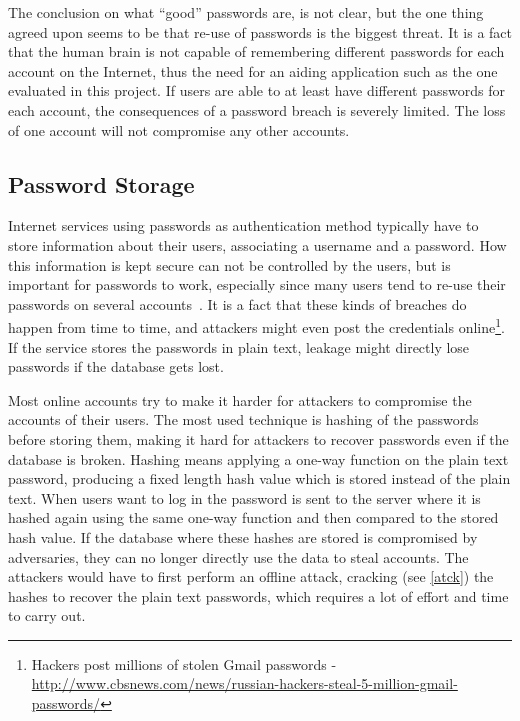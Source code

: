 \par The conclusion on what ``good'' passwords are, is not clear, but the one thing agreed upon seems to be that re-use of passwords is the biggest threat. It is a fact that the human brain is not capable of remembering different passwords for each account on the Internet, thus the need for an aiding application such as the one evaluated in this project. If users are able to at least have different passwords for each account, the consequences of a password breach is severely limited. The loss of one account will not compromise any other accounts. 

\subsection{Password Storage}\label{pw-storage}
Internet services using passwords as authentication method typically have to store information about their users, associating a username and a password. How this information is kept secure can not be controlled by the users, but is important for passwords to work, especially since many users tend to re-use their passwords on several accounts~\cite{domino-effect}. It is a fact that these kinds of breaches do happen from time to time, and attackers might even post the credentials online\footnote{Hackers post millions of stolen Gmail passwords - \url{http://www.cbsnews.com/news/russian-hackers-steal-5-million-gmail-passwords/} }. If the service stores the passwords in plain text, leakage might directly lose passwords if the database gets lost.
\par Most online accounts try to make it harder for attackers to compromise the accounts of their users. The most used technique is hashing of the passwords before storing them, making it hard for attackers to recover passwords even if the database is broken. Hashing means applying a one-way function on the plain text password, producing a fixed length hash value which is stored instead of the plain text. When users want to log in the password is sent to the server where it is hashed again using the same one-way function and then compared to the stored hash value. If the database where these hashes are stored is compromised by adversaries, they can no longer directly use the data to steal accounts. The attackers would have to first perform an offline attack, cracking (see \autoref{atck}) the hashes to recover the plain text passwords, which requires a lot of effort and time to carry out. 

